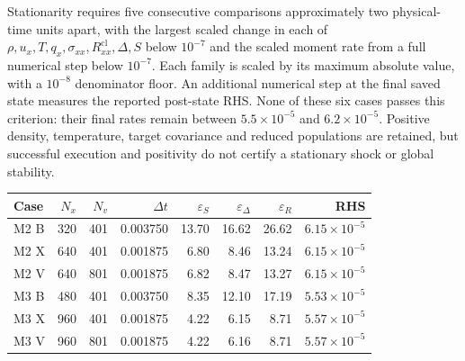 \documentclass[lineno,paper]{JFM-FLM_Au}
\newenvironment{revision}{\nolinenumbers\begin{tcolorbox}[breakable,colback=revisionyellow,colframe=revisionyellow,boxrule=0pt,arc=0pt,left=5pt,right=5pt,top=5pt,bottom=5pt,before skip=6pt,after skip=6pt]\captionsetup{width=\linewidth}}{\end{tcolorbox}\linenumbers}
\newcommand{\revisionbox}[1]{\colorbox{revisionyellow}{#1}}
\newenvironment{revision}{}{}
\newcommand{\revisionbox}[1]{#1}
\newcommand{\cl}{\mathrm{cl}}
\begin{document}
\begin{revision}
Stationarity requires five consecutive comparisons approximately two physical-time units apart, with the largest scaled change in each of $\rho,u_x,T,q_x,\sigma_{xx},R^{\cl}_{xx},\Delta,S$ below $10^{-7}$ and the scaled moment rate from a full numerical step below $10^{-7}$. Each family is scaled by its maximum absolute value, with a $10^{-8}$ denominator floor. An additional numerical step at the final saved state measures the reported post-state RHS. None of these six cases passes this criterion: their final rates remain between $5.5\times10^{-5}$ and $6.2\times10^{-5}$. Positive density, temperature, target covariance and reduced populations are retained, but successful execution and positivity do not certify a stationary shock or global stability.
\end{revision}

\par\medskip\noindent\begin{minipage}{\linewidth}\makeatletter{}\makeatother
\centering
\revisionbox{\begin{minipage}{0.96\textwidth}\captionsetup{width=\linewidth}
\caption{Completed finite-time ES-BGK cases at $Pr=2/3$, $t\simeq400$. B denotes baseline, X coupled spatial/time refinement, and V subsequent axial-velocity refinement. $N_x$ counts cells and $N_v$ axial velocity nodes. The three errors are percentages relative to direct velocity moments on the common mask $|S_{\rm direct}|>0.02\max|S_{\rm direct}|$. They measure steady-form budget reconstruction of a nonstationary snapshot, not ES-BGK model error. RHS is the final scaled full-step moment rate.}
\label{tab:esbgk_evolved}
\centering\small\setlength{\tabcolsep}{3pt}
\begin{tabular}{lrrr rrr r}
\toprule
Case & $N_x$ & $N_v$ & $\Delta t$ & $\varepsilon_S$ & $\varepsilon_\Delta$ & $\varepsilon_R$ & RHS\\
\midrule
M2 B & 320 & 401 & 0.003750 & 13.70 & 16.62 & 26.62 & $6.15\times10^{-5}$\\
M2 X & 640 & 401 & 0.001875 & 6.80 & 8.46 & 13.24 & $6.15\times10^{-5}$\\
M2 V & 640 & 801 & 0.001875 & 6.82 & 8.47 & 13.27 & $6.15\times10^{-5}$\\
M3 B & 480 & 401 & 0.003750 & 8.35 & 12.10 & 17.19 & $5.53\times10^{-5}$\\
M3 X & 960 & 401 & 0.001875 & 4.22 & 6.15 & 8.71 & $5.57\times10^{-5}$\\
M3 V & 960 & 801 & 0.001875 & 4.22 & 6.16 & 8.71 & $5.57\times10^{-5}$\\
\bottomrule
\end{tabular}\par
\end{minipage}}\par
\end{minipage}\par\medskip
\end{document}
